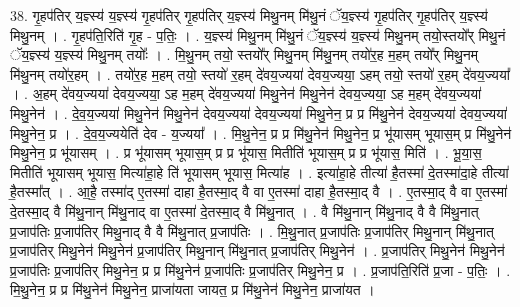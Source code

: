 \documentclass[17pt]{extarticle}
\begin{document}
38. गृ॒हप॑तिर् य॒ज्ञ्स्य॑ य॒ज्ञ्स्य॑ गृ॒हप॑तिर् गृ॒हप॑तिर् य॒ज्ञ्स्य॑ मिथु॒नम् मि॑थु॒नं ॅय॒ज्ञ्स्य॑ गृ॒हप॑तिर् गृ॒हप॑तिर् य॒ज्ञ्स्य॑ मिथु॒नम् । . गृ॒हप॑ति॒रिति॑ गृ॒ह - प॒तिः॒ । . य॒ज्ञ्स्य॑ मिथु॒नम् मि॑थु॒नं ॅय॒ज्ञ्स्य॑ य॒ज्ञ्स्य॑ मिथु॒नम् तयो॒स्तयो᳚र् मिथु॒नं ॅय॒ज्ञ्स्य॑ य॒ज्ञ्स्य॑ मिथु॒नम् तयोः᳚ । . मि॒थु॒नम् तयो॒ स्तयो᳚र् मिथु॒नम् मि॑थु॒नम् तयो॑र॒ह म॒हम् तयो᳚र् मिथु॒नम् मि॑थु॒नम् तयो॑र॒हम् । . तयो॑र॒ह म॒हम् तयो॒ स्तयो॑ र॒हम् दे॑वय॒ज्यया॑ देवय॒ज्यया॒ ऽहम् तयो॒ स्तयो॑ र॒हम् दे॑वय॒ज्यया᳚ । . अ॒हम् दे॑वय॒ज्यया॑ देवय॒ज्यया॒ ऽह म॒हम् दे॑वय॒ज्यया॑ मिथु॒नेन॑ मिथु॒नेन॑ देवय॒ज्यया॒ ऽह म॒हम् दे॑वय॒ज्यया॑ मिथु॒नेन॑ । . दे॒व॒य॒ज्यया॑ मिथु॒नेन॑ मिथु॒नेन॑ देवय॒ज्यया॑ देवय॒ज्यया॑ मिथु॒नेन॒ प्र प्र मि॑थु॒नेन॑ देवय॒ज्यया॑ देवय॒ज्यया॑ मिथु॒नेन॒ प्र । . दे॒व॒य॒ज्ययेति॑ देव - य॒ज्यया᳚ । . मि॒थु॒नेन॒ प्र प्र मि॑थु॒नेन॑ मिथु॒नेन॒ प्र भू॑यासम् भूयास॒म् प्र मि॑थु॒नेन॑ मिथु॒नेन॒ प्र भू॑यासम् । . प्र भू॑यासम् भूयास॒म् प्र प्र भू॑यास॒ मितीति॑ भूयास॒म् प्र प्र भू॑यास॒ मिति॑ । . भू॒या॒स॒ मितीति॑ भूयासम् भूयास॒ मित्या॑हा॒हे ति॑ भूयासम् भूयास॒ मित्या॑ह । . इत्या॑हा॒हे तीत्या॑ है॒तस्मा॑ दे॒तस्मा॑दा॒हे तीत्या॑ है॒तस्मा᳚त् । . आ॒है॒ तस्मा॑द् ए॒तस्मा॑ दाहा है॒तस्मा॒द् वै वा ए॒तस्मा॑ दाहा है॒तस्मा॒द् वै । . ए॒तस्मा॒द् वै वा ए॒तस्मा॑ दे॒तस्मा॒द् वै मि॑थु॒नान् मि॑थु॒नाद् वा ए॒तस्मा॑ दे॒तस्मा॒द् वै मि॑थु॒नात् । . वै मि॑थु॒नान् मि॑थु॒नाद् वै वै मि॑थु॒नात् प्र॒जाप॑तिः प्र॒जाप॑तिर् मिथु॒नाद् वै वै मि॑थु॒नात् प्र॒जाप॑तिः । . मि॒थु॒नात् प्र॒जाप॑तिः प्र॒जाप॑तिर् मिथु॒नान् मि॑थु॒नात् प्र॒जाप॑तिर् मिथु॒नेन॑ मिथु॒नेन॑ प्र॒जाप॑तिर् मिथु॒नान् मि॑थु॒नात् प्र॒जाप॑तिर् मिथु॒नेन॑ । . प्र॒जाप॑तिर् मिथु॒नेन॑ मिथु॒नेन॑ प्र॒जाप॑तिः प्र॒जाप॑तिर् मिथु॒नेन॒ प्र प्र मि॑थु॒नेन॑ प्र॒जाप॑तिः प्र॒जाप॑तिर् मिथु॒नेन॒ प्र । . प्र॒जाप॑ति॒रिति॑ प्र॒जा - प॒तिः॒ । . मि॒थु॒नेन॒ प्र प्र मि॑थु॒नेन॑ मिथु॒नेन॒ प्राजा॑यता जायत॒ प्र मि॑थु॒नेन॑ मिथु॒नेन॒ प्राजा॑यत । \newline
\pagebreak
{}
\end{document}
